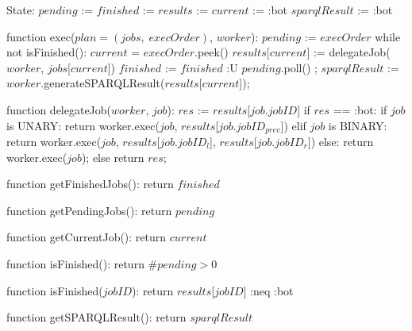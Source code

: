 State:
    $pending$ := {}
    $finished$ := {}
    $results$ := {}
    $current$ := :bot
    $sparqlResult$ := :bot

function exec($plan = (jobs, \; execOrder)$, $worker$):
    $pending$ := $execOrder$
    while not isFinished():
        $current$ = $execOrder$.peek()
        $results$[$current$] := delegateJob($worker$, $jobs$[$current$])
        $finished$ := $finished$ :U { $pending$.poll() };
    $sparqlResult$ := $worker$.generateSPARQLResult($results$[$current$]);

function delegateJob($worker$, $job$):
    $res$ := $results$[$job$.$jobID$]
    if $res$ == :bot:
        if $job$ is UNARY:
            return worker.exec($job$, $results$[$job$.$jobID_{prev}$])
        elif $job$ is BINARY:
            return worker.exec($job$, $results$[$job$.$jobID_l$], $results$[$job$.$jobID_r$])
        else:
            return worker.exec($job$);
    else
        return $res$;

function getFinishedJobs():
    return $finished$

function getPendingJobs():
    return $pending$

function getCurrentJob():
    return $current$

function isFinished():
    return $\#pending > 0$

function isFinished($jobID$):
    return $results$[$jobID$] :neq :bot

function getSPARQLResult():
    return $sparqlResult$
